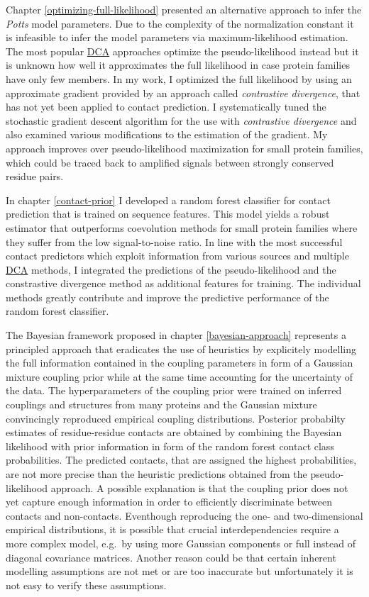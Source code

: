 \documentclass[11pt,a4paper,twoside]{book}
\theoremstyle{definition}
\theoremstyle{definition}
\theoremstyle{remark}
\begin{document}
Chapter \ref{optimizing-full-likelihood} presented an alternative
approach to infer the \emph{Potts} model parameters. Due to the
complexity of the normalization constant it is infeasible to infer the
model parameters via maximum-likelihood estimation. The most popular
\protect\hyperlink{abbrev}{DCA} approaches optimize the
pseudo-likelihood instead but it is unknown how well it approximates the
full likelihood in case protein families have only few members. In my
work, I optimized the full likelihood by using an approximate gradient
provided by an approach called \emph{contrastive divergence}, that has
not yet been applied to contact prediction. I systematically tuned the
stochastic gradient descent algorithm for the use with \emph{contrastive
divergence} and also examined various modifications to the estimation of
the gradient. My approach improves over pseudo-likelihood maximization
for small protein families, which could be traced back to amplified
signals between strongly conserved residue pairs.

In chapter \ref{contact-prior} I developed a random forest classifier
for contact prediction that is trained on sequence features. This model
yields a robust estimator that outperforms coevolution methods for small
protein families where they suffer from the low signal-to-noise ratio.
In line with the most successful contact predictors which exploit
information from various sources and multiple
\protect\hyperlink{abbrev}{DCA} methods, I integrated the predictions of
the pseudo-likelihood and the constrastive divergence method as
additional features for training. The individual methods greatly
contribute and improve the predictive performance of the random forest
classifier.

The Bayesian framework proposed in chapter \ref{bayesian-approach}
represents a principled approach that eradicates the use of heuristics
by explicitely modelling the full information contained in the coupling
parameters in form of a Gaussian mixture coupling prior while at the
same time accounting for the uncertainty of the data. The
hyperparameters of the coupling prior were trained on inferred couplings
and structures from many proteins and the Gaussian mixture convincingly
reproduced empirical coupling distributions. Posterior probabilty
estimates of residue-residue contacts are obtained by combining the
Bayesian likelihood with prior information in form of the random forest
contact class probabilities. The predicted contacts, that are assigned
the highest probabilities, are not more precise than the heuristic
predictions obtained from the pseudo-likelihood approach. A possible
explanation is that the coupling prior does not yet capture enough
information in order to efficiently discriminate between contacts and
non-contacts. Eventhough reproducing the one- and two-dimensional
empirical distributions, it is possible that crucial interdependencies
require a more complex model, e.g.~by using more Gaussian components or
full instead of diagonal covariance matrices. Another reason could be
that certain inherent modelling assumptions are not met or are too
inaccurate but unfortunately it is not easy to verify these assumptions.
\end{document}
